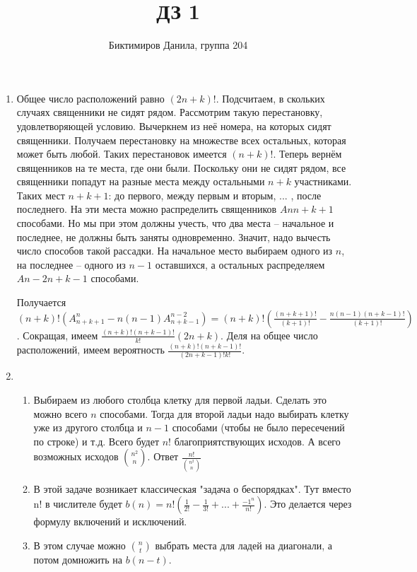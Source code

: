 \documentclass[11pt]{article}
\begin{document}
	
	\author{Биктимиров Данила, группа 204}
	\title{ДЗ 1}
	\date{}
	\maketitle
	
	\medskip
	
	\begin{enumerate}
		
		\item Общее число расположений равно $(2n+k)!$. Подсчитаем, в скольких случаях священники не сидят рядом. Рассмотрим такую перестановку, удовлетворяющей условию. Вычеркнем из неё номера, на которых сидят священники. Получаем перестановку на множестве всех остальных, которая может быть любой. Таких перестановок имеется $(n+k)!$. Теперь вернём священников на те места, где они были. Поскольку они не сидят рядом, все священники попадут на разные места между остальными $n+k$ участниками. Таких мест $n+k+1$: до первого, между первым и вторым, $...$ , после последнего. На эти места можно распределить священников $Ann+k+1$ способами. Но мы при этом должны учесть, что два места -- начальное и последнее, не должны быть заняты одновременно. Значит, надо вычесть число способов такой рассадки. На начальное место выбираем одного из $n$, на последнее -- одного из $n−1$ оставшихся, а остальных распределяем $An−2n+k−1$ способами.
		
		Получается $(n+k)!(A^n_{n+k+1}−n(n−1)A^{n−2}_{n+k−1})=(n+k)!(\frac{(n+k+1)!}{(k+1)!}−\frac{n(n−1)(n+k−1)!}{(k+1)!})$. Сокращая, имеем $\frac{(n+k)!(n+k−1)!}{k!}(2n+k)$. Деля на общее число расположений, имеем вероятность $\frac{(n+k)!(n+k−1)!}{(2n+k−1)!k!}$.
		\item
		\begin{enumerate}
			\item Выбираем из любого столбца клетку для первой ладьи. Сделать это можно всего $n$ способами. Тогда для второй ладьи надо выбирать клетку уже из другого столбца и $n-1$ способами (чтобы не было пересечений по строке) и т.д. Всего будет $n!$ благоприятствующих исходов. А всего возможных исходов ${n^2 \choose n}$. Ответ $\frac{n!}{{n^2 \choose n}}$
			\item В этой задаче возникает классическая "задача о беспорядках". Тут вместо n! в числителе будет $b(n) = n!(\frac{1}{2!} - \frac{1}{3!} + ... + \frac{-1^n}{n!})$. Это делается через формулу включений и исключений. 
			\item В этом случае можно ${n \choose t}$ выбрать места для ладей на диагонали, а потом домножить на $b(n-t)$.
		\end{enumerate}
		
	\end{enumerate}
\end{document}
